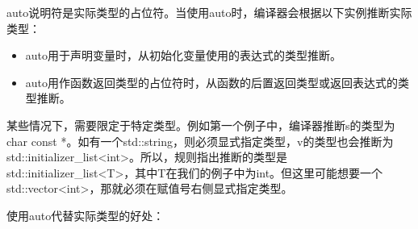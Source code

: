 
auto说明符是实际类型的占位符。当使用auto时，编译器会根据以下实例推断实际类型：

\begin{itemize}
\item
auto用于声明变量时，从初始化变量使用的表达式的类型推断。

\item
auto用作函数返回类型的占位符时，从函数的后置返回类型或返回表达式的类型推断。
\end{itemize}

某些情况下，需要限定于特定类型。例如第一个例子中，编译器推断s的类型为char const *。如有一个std::string，则必须显式指定类型，v的类型也会推断为std::initializer\_list<int>。所以，规则指出推断的类型是std::initializer\_list<T>，其中T在我们的例子中为int。但这里可能想要一个std::vector<int>，那就必须在赋值号右侧显式指定类型。

使用auto代替实际类型的好处：

